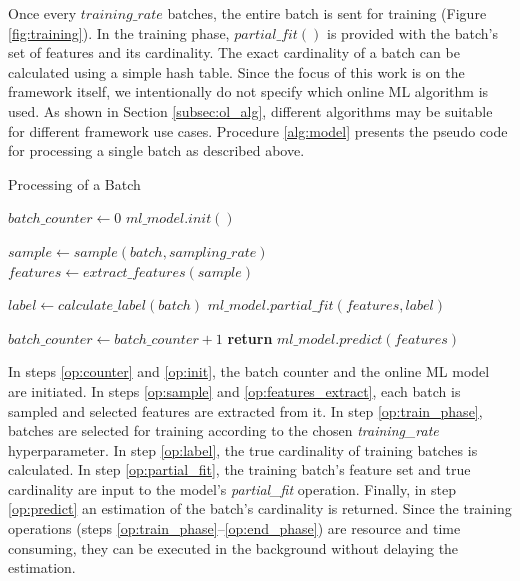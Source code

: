 		Once every $training\_rate$ batches, the entire batch is sent for training (Figure \ref{fig:training}). In the training phase, $partial\_fit()$ is provided with the batch's set of features and its cardinality. The exact cardinality of a batch can be calculated using a simple hash table. Since the focus of this work is on the framework itself, we intentionally do not specify which online ML algorithm is used. As shown in Section \ref{subsec:ol_alg}, different algorithms may be suitable for different framework use cases. Procedure \ref{alg:model} presents the pseudo code for processing a single batch as described above. 
		
		\begin{algorithm}
			\caption{Processing of a Batch}
			\label{alg:model}
			\begin{algorithmic}[1]
				\State $batch\_counter \gets 0$ \label{op:counter}
				\State $ml\_model.init()$ \label{op:init}
				
				\State $sample \gets sample(batch, sampling\_rate)$ \label{op:sample}
				\State $features \gets extract\_features(sample)$  \label{op:features_extract}
				
				 \label{op:train_phase} 
				\State $label \gets calculate\_label(batch)$ \label{op:label}
				\State $ml\_model.partial\_fit(features, label)$ \label{op:partial_fit}
				\EndIf \label{op:end_phase}
				
				\State $batch\_counter \gets batch\_counter + 1$
				\State \textbf{return} $ml\_model.predict(features)$ \label{op:predict}
				
				\EndFunction
			\end{algorithmic}
		\end{algorithm}	
		
		In steps \ref{op:counter} and \ref{op:init}, the batch counter and the online ML model are initiated. In steps \ref{op:sample} and \ref{op:features_extract}, each batch is sampled and selected features are extracted from it. In step \ref{op:train_phase}, batches are selected for training according to the chosen \emph{training\_rate} hyperparameter. In step \ref{op:label}, the true cardinality of training batches is calculated. In step \ref{op:partial_fit}, the training batch's feature set and true cardinality are input to the model's \emph{partial\_fit} operation. Finally, in step \ref{op:predict} an estimation of the batch's cardinality is returned. Since the training operations (steps \ref{op:train_phase}--\ref{op:end_phase}) are resource and time consuming, they can be executed in the background without delaying the estimation.
		
